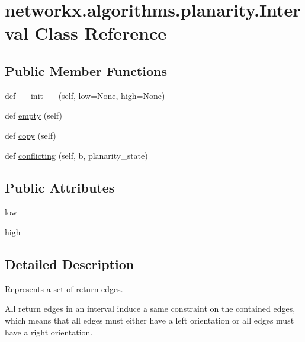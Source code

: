 \hypertarget{classnetworkx_1_1algorithms_1_1planarity_1_1Interval}{}\section{networkx.\+algorithms.\+planarity.\+Interval Class Reference}
\label{classnetworkx_1_1algorithms_1_1planarity_1_1Interval}
\subsection*{Public Member Functions}
\begin{DoxyCompactItemize}
\item 
def \hyperlink{classnetworkx_1_1algorithms_1_1planarity_1_1Interval_ac19cede539a929866b4392d630f130b2}{\+\_\+\+\_\+init\+\_\+\+\_\+} (self, \hyperlink{classnetworkx_1_1algorithms_1_1planarity_1_1Interval_ad430d65011dae14244bc16f134ea8ab8}{low}=None, \hyperlink{classnetworkx_1_1algorithms_1_1planarity_1_1Interval_a7436a666c21e53e3a1a749ae67348c3c}{high}=None)
\item 
def \hyperlink{classnetworkx_1_1algorithms_1_1planarity_1_1Interval_a064a5675d0c53f7e76d925a94c34584f}{empty} (self)
\item 
def \hyperlink{classnetworkx_1_1algorithms_1_1planarity_1_1Interval_ad7252d207ccb8e411766027bdf345c77}{copy} (self)
\item 
def \hyperlink{classnetworkx_1_1algorithms_1_1planarity_1_1Interval_a3898a73f00abd21c7907c718add83994}{conflicting} (self, b, planarity\+\_\+state)
\end{DoxyCompactItemize}
\subsection*{Public Attributes}
\begin{DoxyCompactItemize}
\item 
\hyperlink{classnetworkx_1_1algorithms_1_1planarity_1_1Interval_ad430d65011dae14244bc16f134ea8ab8}{low}
\item 
\hyperlink{classnetworkx_1_1algorithms_1_1planarity_1_1Interval_a7436a666c21e53e3a1a749ae67348c3c}{high}
\end{DoxyCompactItemize}


\subsection{Detailed Description}
\begin{DoxyVerb}Represents a set of return edges.

All return edges in an interval induce a same constraint on the contained
edges, which means that all edges must either have a left orientation or
all edges must have a right orientation.
\end{DoxyVerb}
 

